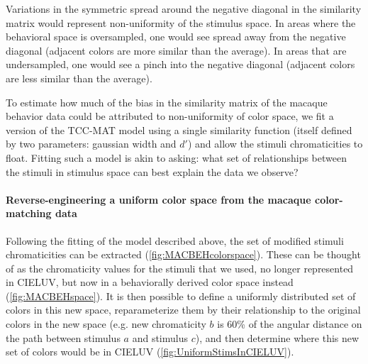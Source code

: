 Variations in the symmetric spread around the negative diagonal in the similarity matrix would represent non-uniformity of the stimulus space. 
In areas where the behavioral space is oversampled, one would see spread away from the negative diagonal (adjacent colors are more similar than the average). 
In areas that are undersampled, one would see a pinch into the negative diagonal (adjacent colors are less similar than the average). 

To estimate how much of the bias in the similarity matrix of the macaque behavior data could be attributed to non-uniformity of color space, we fit a version of the TCC-MAT model using a single similarity function (itself defined by two parameters: gaussian width and $d'$) and allow the stimuli chromaticities to float. 
Fitting such a model is akin to asking: what set of relationships between the stimuli in stimulus space can best explain the data we observe?


\paragraph{Reverse-engineering a uniform color space from the macaque color-matching data }

Following the fitting of the model described above, the set of modified stimuli chromaticities can be extracted (\autoref{fig:MACBEHcolorspace}). 
These can be thought of as the chromaticity values for the stimuli that we used, no longer represented in CIELUV, but now in a behaviorally derived color space instead (\autoref{fig:MACBEHspace}). 
It is then possible to define a uniformly distributed set of colors in this new space, reparameterize them by their relationship to the original colors in the new space (e.g. new chromaticity $b$ is 60\% of the angular distance on the path between stimulus $a$ and stimulus $c$), and then determine where this new set of colors would be in CIELUV (\autoref{fig:UniformStimsInCIELUV}).